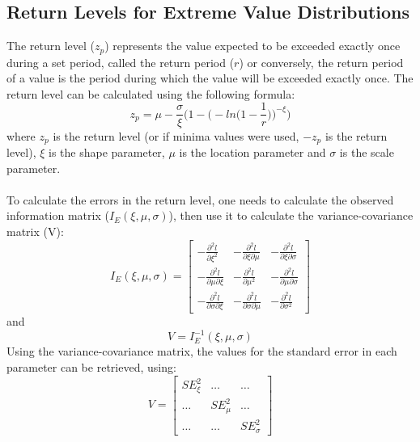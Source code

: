 \documentclass[11pt]{article}
\begin{document}
    \subsection{Return Levels for Extreme Value Distributions}\label{sec:returnlevel}
        The return level ($z_p$) represents the value expected to be exceeded exactly once during a set period, called the return period ($r$) or conversely, the return period of a value is the period during which the value will be exceeded exactly once.
        The return level can be calculated using the following formula\cite{2001coles}:
        \begin{equation}
            z_p = \mu-\frac{\sigma}{\xi}\Bigg( 1-\Bigg( -ln\Bigg( 1-\frac{1}{r}\Bigg) \Bigg) ^{-\xi}\Bigg)  
        \end{equation}
        where $z_p$ is the return level (or if minima values were used, $-z_p$ is the return level), $\xi$ is the shape parameter, $\mu$ is the location parameter and $\sigma$ is the scale parameter.\\ \\
        To calculate the errors in the return level, one needs to calculate the observed information matrix ($I_E(\xi,\mu,\sigma)$), then use it to calculate the variance-covariance matrix (V):
        \begin{equation}
            I_E(\xi,\mu,\sigma) = 
            \begin{bmatrix}
                    -\frac{\partial ^2l}{\partial \xi^2} & -\frac{\partial ^2l}{\partial \xi \partial \mu} & -\frac{\partial ^2l}{\partial \xi \partial \sigma} \\
                    -\frac{\partial ^2l}{\partial \mu \partial \xi} & -\frac{\partial ^2l}{\partial \mu^2} & -\frac{\partial ^2l}{\partial \mu \partial \sigma} \\
                    -\frac{\partial ^2l}{\partial \sigma \partial \xi} & -\frac{\partial ^2l}{\partial \sigma \partial \mu} & -\frac{\partial ^2l}{\partial \sigma^2}
            \end{bmatrix}
        \end{equation}
        and
        \begin{equation}
            V=I_E^{-1}(\xi,\mu,\sigma)
        \end{equation}
        Using the variance-covariance matrix, the values for the standard error in each parameter can be retrieved, using:
        \begin{equation}
            V=
            \begin{bmatrix}
                    SE_\xi^2 & \ldots & \ldots \\
                    \ldots & SE_\mu^2 & \ldots \\
                    \ldots & \ldots & SE_\sigma^2
            \end{bmatrix}
        \end{equation}
\end{document}
